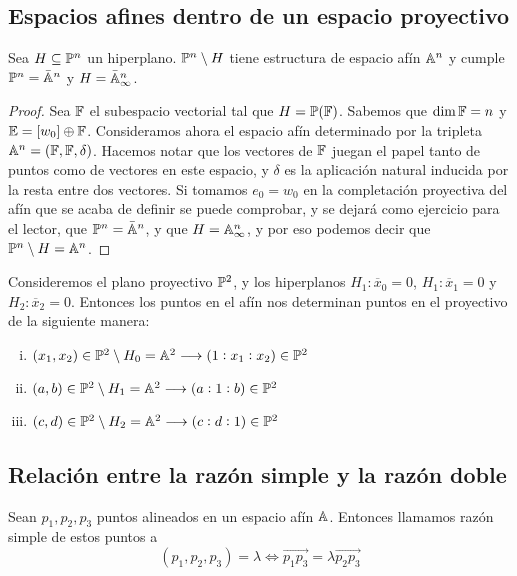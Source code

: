  \subsection{Espacios afines dentro de un espacio proyectivo}

 \begin{prop}
   Sea $H \subseteq \mathbb{P}^n$ un hiperplano. $\mathbb{P}^n \setminus H$ tiene estructura de
   espacio afín $\mathbb{A}^n$ y cumple $\mathbb{P}^n = \bar{\mathbb{A}}^n$ y $H = \bar{\mathbb{A}}^n_\infty$.
 \end{prop}

 \begin{proof}
  Sea $\mathbb{F}$ el subespacio vectorial tal que $H = \mathbb{P}(\mathbb{F})$. Sabemos que $\dim \mathbb{F} = n$ y
  $\mathbb{E} = [w_0] \oplus \mathbb{F}$. Consideramos ahora el espacio afín determinado por la tripleta
  $\mathbb{A}^n = (\mathbb{F}, \mathbb{F}, \delta)$. Hacemos notar que los vectores de $\mathbb{F}$ juegan el papel 
  tanto de puntos como de vectores
  en este espacio, y $\delta$ es la aplicación natural inducida por la resta entre dos
  vectores. Si tomamos $e_0 = w_0$ en la completación proyectiva
  del afín que se acaba de definir se puede comprobar, y se dejará como ejercicio para
  el lector, que $\mathbb{P}^n = \bar{\mathbb{A}}^n$, y que $H = \mathbb{A}^n_\infty$, y por eso podemos
  decir que $\mathbb{P}^n \setminus H = \mathbb{A}^n$.
 \end{proof}

\begin{example}
  Consideremos el plano proyectivo $\mathbb{P}^2$, y los hiperplanos $H_1\colon \overline{x}_0 = 0$,
  $H_1 \colon \overline{x}_1 = 0$ y $H_2 \colon \overline{x}_2 = 0$. Entonces los puntos
  en el afín nos determinan puntos en el proyectivo de la siguiente manera:
  \begin{enumerate}[i)]
    \item $(x_1, x_2) \in \mathbb{P}^2 \setminus H_0 = \mathbb{A}^2 \longrightarrow (1:x_1:x_2) \in \mathbb{P}^2$
    \item $(a, b) \in \mathbb{P}^2 \setminus H_1 = \mathbb{A}^2 \longrightarrow (a:1:b) \in \mathbb{P}^2$
    \item $(c, d) \in \mathbb{P}^2 \setminus H_2 = \mathbb{A}^2 \longrightarrow (c:d:1) \in \mathbb{P}^2$
  \end{enumerate}
\end{example}

\subsection{Relación entre la razón simple y la razón doble}

\begin{defi}
Sean $p_1, p_2, p_3$ puntos alineados en un espacio afín $\mathbb{A}$. Entonces llamamos razón
simple de estos puntos a
\[(p_1, p_2, p_3) = \lambda \iff \overrightarrow{p_1p_3} = \lambda \overrightarrow{p_2p_3}\]
\end{defi}

